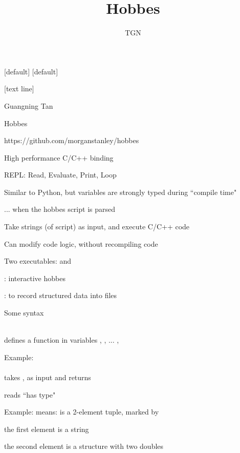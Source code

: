 \documentclass[svgnames,fleqn]{beamer}
\begin{document}
[default]
[default]
\title{Hobbes}
\author{TGN}
\date{}
\frame\titlepage
\setcounter{page}{1}
[text line]{
\parbox{\linewidth}{\hfill {
Guangning Tan
}\hfill{\large\insertpagenumber}
}}

\begin{frame}{Hobbes}

https://github.com/morganstanley/hobbes

\bi
\item High performance C/C++ binding
\item REPL: Read, Evaluate, Print, Loop
\item Similar to Python, but variables are strongly typed during ``compile time"
\bi
\item ... when the hobbes script is parsed
\ei
\item Take strings (of script) as input, and execute C/C++ code
\item Can modify code logic, without recompiling code
\ei

\end{frame}

\begin{frame}{Two executables:  and }
\bi
\item {}: interactive hobbes
\item {}: to record structured data into files
\ei
\end{frame}

\begin{frame}{Some syntax}
\bi
\item {} \\
defines a function  in variables , , ... , 
\bi
\item Example:\\
\\
takes ,  as input and returns 
\ei
\item \li{::} reads ``has type"
\bi
\item Example:
means:  is a 2-element tuple, marked by \li{*}
\bi
\item the first element is a string
\item the second element is a structure with two doubles
\ei
\ei
\ei

\end{frame}
\end{document}
